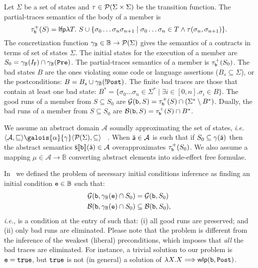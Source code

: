 \documentclass{llncs}
\begin{document}
Let $\Sigma$ be a set of states and $\tau \in \mathcal{P}{(\Sigma \times \Sigma)}$ be the transition function.
The partial-traces semantics of the body  of a member is 
\[
\tau_{\mathtt{b}}^+(S) = \mathsf{lfp} \lambda T.\ S \cup \{ \sigma_0 \dots \sigma_n \sigma_{n+1} \mid \sigma_0 \dots \sigma_n \in T \wedge \tau(\sigma_n, \sigma_{n+1}) \}.
\]
The concretization function $\gamma_\mathbb{B} \in \mathbb{B} \rightarrow \mathcal{P}{(\Sigma)}$ gives the semantics of a contracts in terms of set of states $\Sigma$.
The initial states for the execution of a member are $S_0 = \gamma_\mathbb{B}(I_{\mathtt{F}}) \cap  \gamma_\mathbb{B}(\mathtt{Pre})$.
The partial-traces semantics of a member is $\tau_{\mathtt{b}}^+(S_0)$.
The bad states $B$ are the ones violating some code or language assertions ($B_s \subseteq \Sigma$), or the postconditions: $B = B_s \cup \gamma_\mathbb{B}(\mathtt{!Post})$.
The finite bad traces are those that contain at least one bad state: $B^* = \{ \sigma_0 \dots \sigma_n \in \Sigma^* \mid \exists i \in [0, n]. \sigma_i \in B\}$.
The good runs of a member from $S \subseteq S_0$ are $\mathcal{G}(\mathtt{b}, S) = \tau_{\mathtt{b}}^+(S) \cap (\Sigma^* \setminus B^*)$.
Dually, the bad runs of a member  from $S \subseteq S_0$ are $\mathcal{B}(\mathtt{b}, S) = \tau_{\mathtt{b}}^+(S) \cap  B^*$.

We assume  an abstract domain $\mathcal{A}$ soundly approximating the set of states, \emph{i.e.} $\langle \mathcal{A}, \sqsubseteq \rangle \galois{\alpha}{\gamma} \langle \parti{\Sigma}, \subseteq \rangle$ ~\cite{CousotCousot77}.
When $\bar{\mathsf{\mathsf{a}}} \in \mathcal{A}$ is such that if $S_0 \subseteq \gamma(\bar{\mathsf{\mathsf{a}}})$ then the abstract semantics $\mathbb{\bar{\mathsf{s}}}\llbracket \mathtt{\mathtt{b}} \rrbracket(\bar{\mathsf{\mathsf{a}}}) \in \mathcal{A}$ overapproximates $\tau_{\mathtt{b}}^+(S_0)$.
We also assume a mapping $\mu \in \mathcal{A} \rightarrow \mathbb{B}$ converting abstract elements into side-effect free formulae.

In~\cite{CousotCousotLogozzo11} we defined the problem of  necessary initial conditions inference as finding an initial condition $\mathtt{e} \in \mathbb{B}$ such that: 
\[
\begin{split}
\mathcal{G}(\mathtt{b}, \gamma_\mathbb{B}(\mathtt{e}) \cap S_0) & = \mathcal{G}(\mathtt{b}, S_0) \\
\mathcal{B}(\mathtt{b}, \gamma_\mathbb{B}(\mathtt{e}) \cap S_0) & \subseteq \mathcal{B}(\mathtt{b}, S_0),
\end{split}
\]
\emph{i.e.},  is a condition at  the entry of  such that: (i) all good runs are preserved; and (ii) only bad runs are eliminated.
Please note that the problem is different from the inference of the weakest (liberal) preconditions, which imposes that \emph{all} the bad traces are eliminated.
For instance, a trivial solution to our problem is $\mathtt{e} = \mathtt{true}$, but $\mathtt{true}$ is not (in general) a solution of $\lambda X. X \Longrightarrow\mathsf{wlp}(\mathtt{b}, \mathtt{Post})$.
\end{document}
